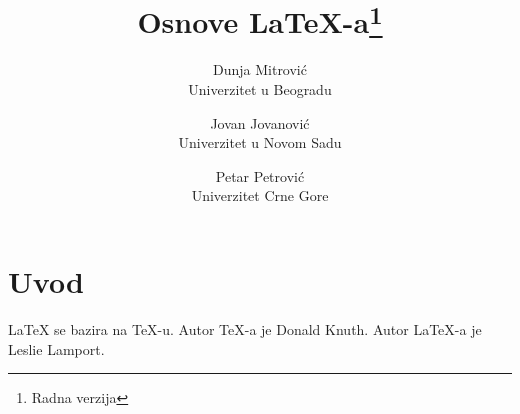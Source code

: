 \documentclass{article}
\title{Osnove \LaTeX{}-a\thanks{Radna verzija}}
\author{Dunja Mitrović \\ Univerzitet u Beogradu \and
	Jovan Jovanović \\ Univerzitet u Novom Sadu \and
	Petar Petrović \\ Univerzitet Crne Gore}
\date{}
\begin{document}
\maketitle
\section{Uvod}
\LaTeX{} se bazira na \TeX{}-u. 
Autor \TeX{}-a je Donald Knuth.
Autor \LaTeX{}-a je Leslie Lamport.
\end{document}

